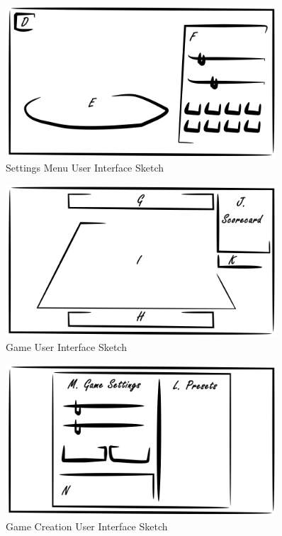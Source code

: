 \documentclass[12pt, titlepage]{article}
\begin{document}
\begin{figure}[h!]
\caption{Settings Menu User Interface Sketch}
\centering
\includegraphics[width=0.9\textwidth]{figures/settings}
\end{figure}



\begin{figure}[h!]
\caption{Game User Interface Sketch}
\centering
\includegraphics[width=0.9\textwidth]{figures/game_interface}
\end{figure}



\begin{figure}[h!]
\caption{Game Creation User Interface Sketch}
\centering
\includegraphics[width=0.9\textwidth]{figures/game_creation}
\end{figure}
\end{document}
